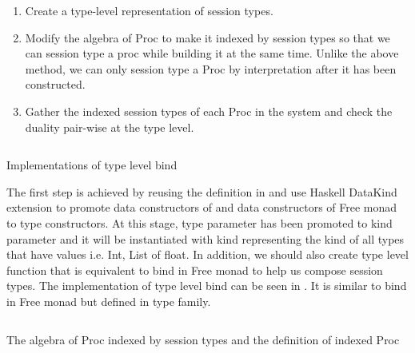 \begin{enumerate}
    \item Create a type-level representation of session types.
    \item Modify the algebra of Proc to make it indexed by session types so that we can session type a proc while building it at the same time. Unlike the above method, we  can only session type a Proc by interpretation after it has been constructed.
    \item Gather the indexed session types of each Proc in the system and check the duality pair-wise at the type level.
\end{enumerate}
\begin{listing}[ht]
    \inputminted{Haskell}{impl/typebind.hs}
    \caption{Implementations of type level bind}
    \label{impl:code:typebind}
\end{listing}
The first step is achieved by reusing the definition in  and use Haskell DataKind extension to promote data constructors of  and data constructors of Free monad to type constructors. At this stage, type parameter  has been promoted to kind parameter and it will be instantiated with kind \hask{*} representing the kind of all types that have values i.e. Int, List of float. In addition, we should also create type level function that is equivalent to bind in Free monad to help us compose session types. The implementation of type level bind \hask{>*>} can be seen in . It is similar to bind in Free monad but defined in type family. 
\begin{listing}[ht]
    \inputminted{Haskell}{impl/typeproc.hs}
    \caption{The algebra of Proc indexed by session types and the definition of indexed Proc}
    \label{impl:code:typeproc}
\end{listing}

